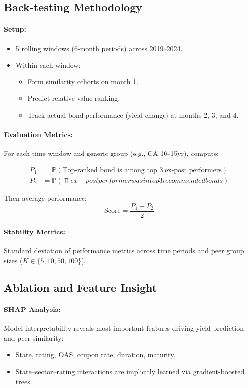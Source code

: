 \documentclass{article}
\begin{document}
\subsection*{Back-testing Methodology}

\paragraph{Setup:}
\begin{itemize}[nosep]
    \item 5 rolling windows (6-month periods) across 2019–2024.
    \item Within each window:
        \begin{itemize}[nosep]
            \item Form similarity cohorts on month 1.
            \item Predict relative value ranking.
            \item Track actual bond performance (yield change) at months 2, 3, and 4.
        \end{itemize}
\end{itemize}

\paragraph{Evaluation Metrics:}

For each time window and generic group (e.g., CA 10–15yr), compute:

\begin{align*}
    P_1 &= \mathbb{P}(\text{Top-ranked bond is among top 3 ex-post performers}) \\
    P_2 &= \mathbb{P}(\Top ex-post performer was in top 3 recommended bonds)
\end{align*}

Then average performance:
\[
\text{Score} = \frac{P_1 + P_2}{2}
\]

\paragraph{Stability Metrics:}
Standard deviation of performance metrics across time periods and peer group sizes (\( K \in \{5, 10, 50, 100\} \)).

\subsection*{Ablation and Feature Insight}

\paragraph{SHAP Analysis:}
Model interpretability reveals most important features driving yield prediction and peer similarity:
\begin{itemize}[nosep]
    \item State, rating, OAS, coupon rate, duration, maturity.
    \item State–sector–rating interactions are implicitly learned via gradient-boosted trees.
\end{itemize}
\end{document}
